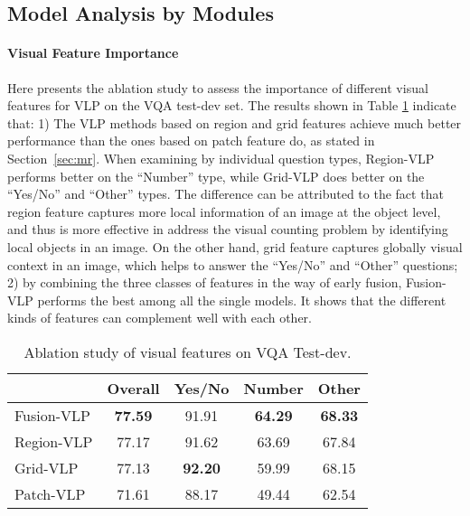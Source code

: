 \subsection{Model Analysis by Modules} \label{sec:model_analysis}

\paragraph{Visual Feature Importance}
Here presents the ablation study to assess the importance of different visual features for VLP on the VQA test-dev set. The results shown in Table \ref{table:vf} indicate that: 1) The VLP methods based on region and grid features achieve much better performance than the ones based on patch feature do, as stated in Section~\ref{sec:mr}. When examining by individual question types, Region-VLP performs better on the ``Number'' type, while Grid-VLP does better on the ``Yes/No'' and ``Other'' types. The difference can be attributed to the fact that region feature captures more local information of an image at the object level, and thus is more effective in address the visual counting problem by identifying local objects in an image. On the other hand, grid feature captures globally visual context in an image, which helps to answer the ``Yes/No'' and ``Other'' questions; 2) by combining the three classes of features in the way of early fusion, Fusion-VLP performs the best among all the single models. It shows that the different kinds of features can complement well with each other.

\begin{table}[t]
\centering
\caption{Ablation study of visual features on VQA Test-dev.} \label{table:vf}
\begin{tabular}{lcccc}
\toprule
           & Overall & Yes/No & Number & Other \\
\midrule
Fusion-VLP &  \textbf{77.59}    &  91.91    &   \textbf{64.29}    &    \textbf{68.33}   \\
Region-VLP & 77.17 & 91.62  & 63.69 &  67.84     \\
Grid-VLP   &  77.13  &  \textbf{92.20}    &   59.99     &   68.15    \\
Patch-VLP  &    71.61     &  88.17      &   49.44     &   62.54    \\
\bottomrule
\end{tabular}
\end{table}

